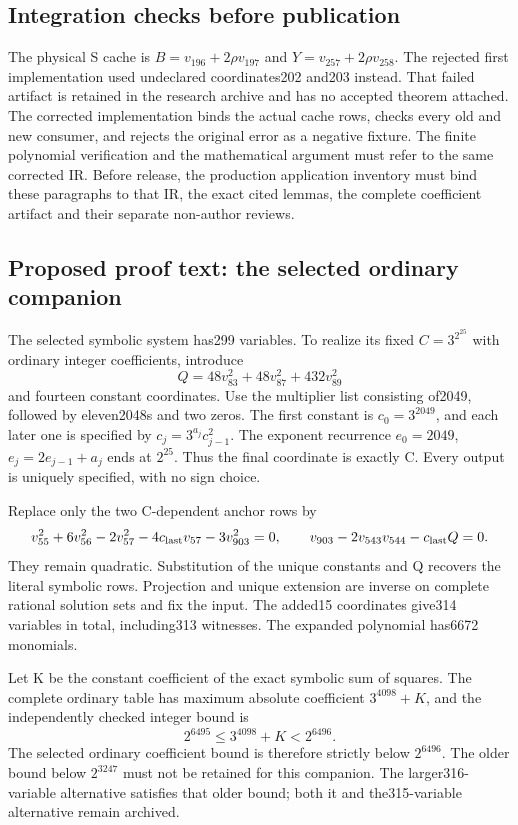 \documentclass{article}
\begin{document}
\subsection{Integration checks before publication}
\label{outline:r6-expanded-binding}
The physical S cache is $B=v_{196}+2\rho v_{197}$ and
$Y=v_{257}+2\rho v_{258}$. The rejected first implementation used
undeclared coordinates202 and203 instead. That failed artifact is
retained in the research archive and has no accepted theorem attached.
The corrected implementation binds the actual cache rows, checks every
old and new consumer, and rejects the original error as a negative
fixture. The finite polynomial verification and the mathematical
argument must refer to the same corrected IR. Before release, the
production application inventory must bind these paragraphs to that IR,
the exact cited lemmas, the complete coefficient artifact and their
separate non-author reviews.

\subsection{Proposed proof text: the selected ordinary companion}
\label{outline:r6-expanded-ordinary314}
The selected symbolic system has299 variables. To realize its fixed
$C=3^{2^{25}}$ with ordinary integer coefficients, introduce
\[
 Q=48v_{83}^2+48v_{87}^2+432v_{89}^2
\]
and fourteen constant coordinates. Use the multiplier list consisting
of2049, followed by eleven2048s and two zeros. The first constant is
$c_0=3^{2049}$, and each later one is specified by
$c_j=3^{a_j}c_{j-1}^2$. The exponent recurrence
$e_0=2049$, $e_j=2e_{j-1}+a_j$ ends at $2^{25}$.
Thus the final coordinate is exactly C. Every output is uniquely
specified, with no sign choice.

Replace only the two C-dependent anchor rows by
\[
 v_{55}^2+6v_{56}^2-2v_{57}^2-4c_{\rm last}v_{57}
       -3v_{903}^2=0,
\qquad
 v_{903}-2v_{543}v_{544}-c_{\rm last}Q=0.
\]
They remain quadratic. Substitution of the unique constants and Q
recovers the literal symbolic rows. Projection and unique extension
are inverse on complete rational solution sets and fix the input.
The added15 coordinates give314 variables in total, including313
witnesses. The expanded polynomial has6672 monomials.

Let K be the constant coefficient of the exact symbolic sum of
squares. The complete ordinary table has maximum absolute coefficient
$3^{4098}+K$, and the independently checked integer bound is
\[
 2^{6495}\le 3^{4098}+K<2^{6496}.
\]
The selected ordinary coefficient bound is therefore strictly below
$2^{6496}$. The older bound below $2^{3247}$ must not be retained for
this companion. The larger316-variable alternative satisfies that
older bound; both it and the315-variable alternative remain archived.
\end{document}
